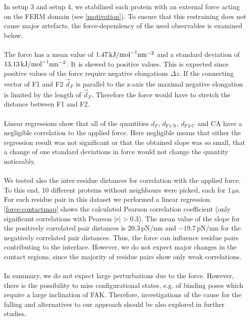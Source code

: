 \label{forceana}
In setup 3 and setup 4, we stabilized each protein with an external force acting on the FERM domain (see \autoref{motivation}). To ensure that this restraining does not cause major artefacts, the force-dependency of the used observables is examined below.\\
\\
The force has a mean value of $1.47\,\forceunit$ and a standard deviation of $13.13\,\forceunit$. It is skewed to positive values. This is expected since positive values of the force require negative elongations $\Delta z$. If the connecting vector of F1 and F2 $\vec{d}_F$ is parallel to the z-axis the maximal negative elongation is limited by the length of $\vec{d}_F$. Therefore the force would have to stretch the distance between F1 and F2.\\ %
\\
Linear regressions show that all of the quantities $d_F$, $d_\text{F1-N}$, $d_\text{F2-C}$ and CA have a negligible correlation to the applied force. Here negligible means that either the regression result was not significant or that the obtained slope was so small, that a change of one standard deviations in force would not change the quantity noticeably.\\
\\
We tested also the inter-residue distances for correlation with the applied force. To this end, 10 different proteins without neighbours were picked, each for $1\,\si{\micro\second}$. For each residue pair in this dataset we performed a linear regression. \autoref{force:contactmap} shows the calculated Pearson correlation coefficient (only significant correlations with Pearson $\left|r\right| > 0.3$). The mean value of the slope for the positively correlated pair distances is $20.3\,\si{\pico\newton/\nano\metre}$ and $-19.7\,\si{\pico\newton/\nano\metre}$ for the negatively correlated pair distances. Thus, the force can influence residue pairs contributing to the interface. However, we do not expect major changes in the contact regions, since the majority of residue pairs show only weak correlations.\\
\\
In summary, we do not expect large perturbations due to the force. However, there is the possibility to miss configurational states, e.g. of binding poses which require a large inclination of FAK. Therefore, investigations of the cause for the falling and alternatives to our approach should be also explored in further studies.
